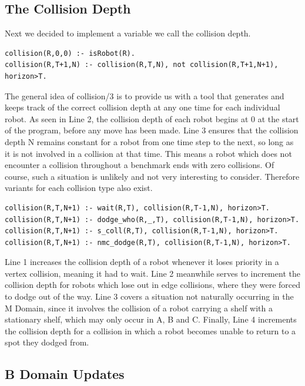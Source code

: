 \documentclass{llncs}
\begin{document}
\subsection{The Collision Depth}
Next we decided to implement a variable we call the collision depth.
\begin{lstlisting}[basicstyle=\fontsize{9}{11}\selectfont\ttfamily,frame=single,breaklines=true]
collision(R,0,0) :- isRobot(R).
collision(R,T+1,N) :- collision(R,T,N), not collision(R,T+1,N+1), horizon>T.
\end{lstlisting}
The general idea of collision/3 is to provide us with a tool that generates and keeps track of the correct collision depth at any one time for each individual robot. As seen in Line 2, the collision depth of each robot begins at 0 at the start of the program, before any move has been made. Line 3 ensures that the collision depth N remains constant for a robot from one time step to the next, so long as it is not involved in a collision at that time. This means a robot which does not encounter a collision throughout a benchmark ends with zero collisions.\newline\newline
Of course, such a situation is unlikely and not very interesting to consider. Therefore variants for each collision type also exist.\newpage
\begin{lstlisting}[basicstyle=\fontsize{9}{11}\selectfont\ttfamily,frame=single,breaklines=true]
collision(R,T,N+1) :- wait(R,T), collision(R,T-1,N), horizon>T.
collision(R,T,N+1) :- dodge_who(R,_,T), collision(R,T-1,N), horizon>T.
collision(R,T,N+1) :- s_coll(R,T), collision(R,T-1,N), horizon>T.
collision(R,T,N+1) :- nmc_dodge(R,T), collision(R,T-1,N), horizon>T.
\end{lstlisting}
Line 1 increases the collision depth of a robot whenever it loses priority in a vertex collision, meaning it had to wait. Line 2 meanwhile serves to increment the collision depth for robots which lose out in edge collisions, where they were forced to dodge out of the way. Line 3 covers a situation not naturally occurring in the M Domain, since it involves the collision of a robot carrying a shelf with a stationary shelf, which may only occur in A, B and C. Finally, Line 4 increments the collision depth for a collision in which a robot becomes unable to return to a spot they dodged from.\newline
\subsection{B Domain Updates}
\end{document}
